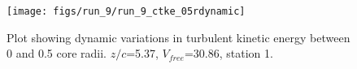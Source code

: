 \begin{figure}[H]
\centering
\texttt{[image: figs/run\_9/run\_9\_ctke\_05rdynamic]}
\caption{Plot showing dynamic variations in turbulent kinetic energy between 0 and 0.5 core radii. $z/c$=5.37, $V_{free}$=30.86, station 1.}
\label{fig:run_9_ctke_05rdynamic}
\end{figure}


